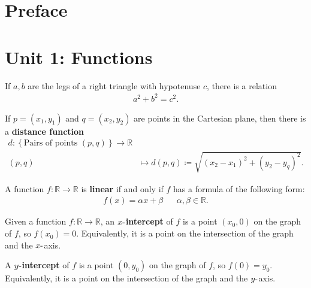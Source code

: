 \newpage

\tableofcontents
\newpage

\hypertarget{preface}{%
\section{Preface}\label{preface}}

\hypertarget{unit-1-functions}{%
\section{Unit 1: Functions}\label{unit-1-functions}}

\begin{theorem}

If \(a,b\) are the legs of a right triangle with hypotenuse \(c\), there
is a relation
\begin{align*}
a^2 + b^2 = c^2
.\end{align*}

\end{theorem}

\begin{theorem}

If \(p = (x_1, y_1)\) and \(q = (x_2, y_2)\) are points in the Cartesian
plane, then there is a \textbf{distance function}
\begin{align*}
d: \left\{{ \text{Pairs of points } (p, q) }\right\} \to {\mathbb{R}}\\
(p, q) &\mapsto d(p, q) \coloneqq\sqrt{ (x_2 - x_1)^2 + (y_2 - y_q)^2}
.\end{align*}

\end{theorem}


\begin{definition}

A function \(f:{\mathbb{R}}\to {\mathbb{R}}\) is \textbf{linear} if and
only if \(f\) has a formula of the following form:
\begin{align*}
f(x) = \alpha x + \beta && \alpha, \beta \in {\mathbb{R}}
.\end{align*}

\end{definition}

\begin{definition}[Intercepts]

Given a function \(f: {\mathbb{R}}\to {\mathbb{R}}\), an
\textbf{\(x{\hbox{-}}\)intercept} of \(f\) is a point \((x_0, 0)\) on
the graph of \(f\), so \(f(x_0) = 0\). Equivalently, it is a point on
the intersection of the graph and the \(x{\hbox{-}}\)axis.

\hfill\break

A \textbf{\(y{\hbox{-}}\)intercept} of \(f\) is a point \((0, y_0)\) on
the graph of \(f\), so \(f(0) = y_0\). Equivalently, it is a point on
the intersection of the graph and the \(y{\hbox{-}}\)axis.

\end{definition}

